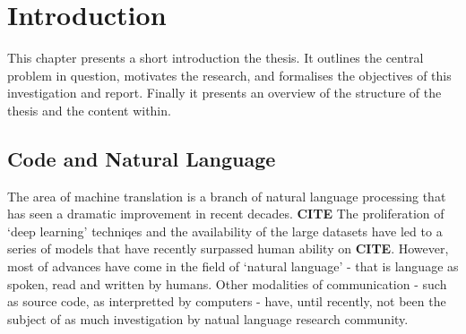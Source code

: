 \chapter{Introduction}
\label{chapterlabel1}




This chapter presents a short introduction the thesis. 
It outlines the central problem in question, motivates the research, and formalises the objectives of this investigation and report. 
Finally it presents an overview of the structure of the thesis and the content within.





\section{Code and Natural Language} %
\label{sec:code_and_natural_language}

The area of machine translation is a branch of natural language processing that has seen a dramatic improvement in recent decades. \textbf{CITE}
The proliferation of `deep learning' techniqes and the availability of the large datasets have led to a series of models that have recently surpassed human ability on \textbf{CITE}. %
However, most of advances have come in the field of `natural language' - that is language as spoken, read and written by humans. 
Other modalities of communication - such as source code, as interpretted by computers - have, until recently, not been the subject of as much investigation by natual language research community.



